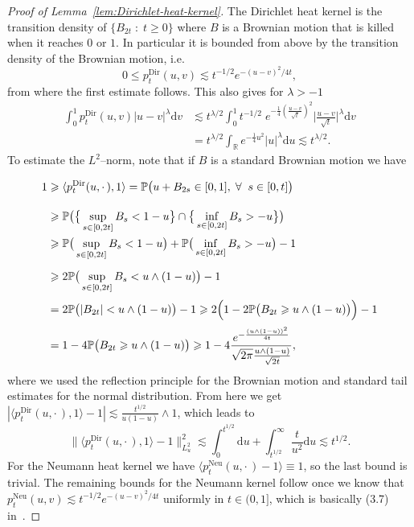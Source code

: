 \documentclass[AHL,Unicode,longabstracts]{cedram}
\DeclareMathOperator{\Dir}{Dir}
\DeclareMathOperator{\Neu}{Neu}
\renewcommand{\leq}{\leqslant}
\renewcommand{\geq}{\geqslant}
\newcommand*{\dd}{\mathrm{d}}
\newcommand*{\du}{\dd u}
\newcommand*{\dv}{\dd v}
\let\oldforall\forall
\renewcommand*{\forall}{\mathrel{\oldforall}}
\begin{document}
\begin{proof}[Proof of Lemma~\ref{lem:Dirichlet-heat-kernel}]
The Dirichlet heat kernel is the transition density of $\{B_{2 t} \; : \; t
\geq 0\}$ where $B$ is a Brownian motion that is killed when it reaches $0$ or $1$. In particular it is bounded from above by the transition density of the Brownian motion, i.e.
\[
0 \leq p^{\Dir}_t (u, v) \lesssim t^{- 1 / 2} e^{- (u - v)^2 / 4 t},
\]
from where the first estimate follows. This also gives for $\lambda > - 1$
\begin{align*}
\int_0^1 p^{\Dir}_t (u, v) | u - v |^{\lambda} \dv &\lesssim t^{\lambda /2} \int_0^1 t^{- 1 / 2} \; e^{- \frac{1}{4} \left(\frac{u - v}{\sqrt{t}}\right)^2} \bigg| \frac{u - v}{\sqrt{t}} \bigg|^{\lambda} \dv
\\& = t^{\lambda / 2} \int_{\mathbb{R}} e^{- \frac{1}{4} u^2} | u |^{\lambda} \du \lesssim t^{\lambda / 2}.
\end{align*}
To estimate the $L^2$--norm, note that if $B$ is a standard Brownian motion we have
\begingroup
\allowdisplaybreaks
\begin{align*}
1 & \geq \langle p_t^{\Dir} (u, \cdot\,), 1 \rangle =\mathbb{P} \big(u + B_{2 s} \in [0, 1], \; \forall \; s \in [0, t]\big) \vphantom{\int} \\
& \geq \mathbb{P} \big(\big\{ \sup_{s \in [0, 2 t]} B_s < 1 - u \big\} \cap \big\{ \inf_{s \in [0, 2t]} B_s > - u \big\}\big)\vphantom{\int}\\
& \geq \mathbb{P} \big(\sup_{s \in [0, 2 t]} B_s < 1 - u\big) +\mathbb{P}
\big(\inf_{s \in [0, 2t]} B_s > - u\big) - 1 \\
& \vphantom{\int} \geq 2\mathbb{P}\big(\sup_{s \in [0, 2 t]} B_s < u \wedge (1 - u)\big) - 1\vphantom{\int}\\
& = 2\mathbb{P} \big(| B_{2 t} | < u \wedge (1 - u)\big) - 1 \geq 2 \Big(1 - 2\mathbb{P} \big(B_{2 t} \geq u \wedge (1 - u)\big)\Big) - 1\vphantom{\int}\\*
& = 1 - 4\mathbb{P} \big(B_{2 t} \geq u \wedge (1 - u)\big) \geq 1 - 4
\frac{e^{- \frac{(u \wedge (1 - u))^2}{4 t}}}{\sqrt{2 \pi} \frac{u \wedge (1 - u)}{\sqrt{2 t}}},
\end{align*}
\endgroup
where we used the reflection principle for the Brownian motion and standard tail estimates for the normal distribution. From here we get $| \langle p_t^{\Dir} (u, \cdot\,), 1 \rangle - 1 | \lesssim \frac{t^{1 / 2}}{u (1 - u)}
\wedge 1$, which leads to
\[
\big\| \langle p_t^{\Dir} (u, \cdot\,), 1 \rangle - 1 \big\|_{L^2_u}^2 \lesssim
\int_0^{t^{1 / 2}} \du + \int_{t^{1 / 2}}^{\infty} \frac{t}{u^2} \du \lesssim t^{1 / 2}.
\]
For the Neumann heat kernel we have $\langle p^{\Neu}_t(u, \cdot\,) -1\rangle \equiv 1$, so the last bound is trivial. The remaining bounds for the Neumann kernel follow once we know that $p^{\Neu}_t (u, v) \lesssim t^{- 1 / 2} e^{- (u - v)^2 / 4 t}$ uniformly in $t \in (0,1]$, which is basically (3.7) in~\cite{Walsh1986}.
\end{proof}
\end{document}
